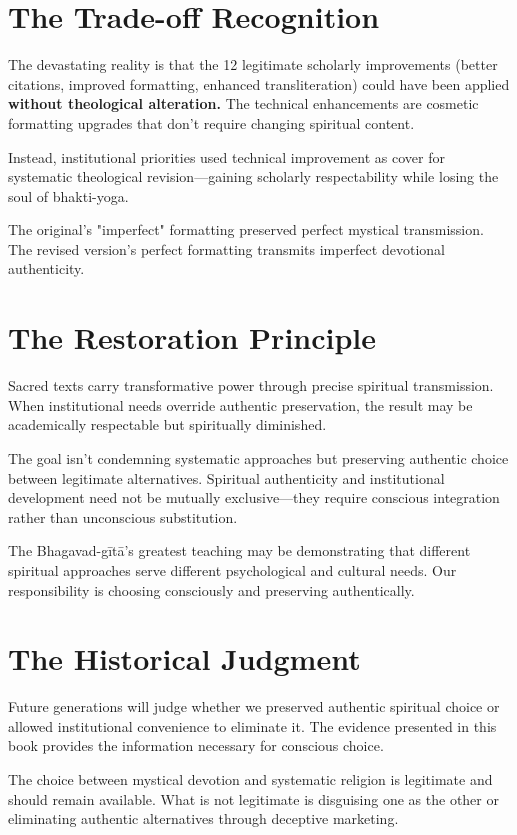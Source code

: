 \documentclass[11pt,twoside]{book}
\begin{document}
\section*{The Trade-off Recognition}
\label{sec:org1c2ef7d}

The devastating reality is that the 12 legitimate scholarly improvements (better citations, improved formatting, enhanced transliteration) could have been applied \textbf{\textbf{without theological alteration.}} The technical enhancements are cosmetic formatting upgrades that don't require changing spiritual content.

Instead, institutional priorities used technical improvement as cover for systematic theological revision—gaining scholarly respectability while losing the soul of bhakti-yoga.

The original's "imperfect" formatting preserved perfect mystical transmission. The revised version's perfect formatting transmits imperfect devotional authenticity.
\section*{The Restoration Principle}
\label{sec:org077134f}

Sacred texts carry transformative power through precise spiritual transmission. When institutional needs override authentic preservation, the result may be academically respectable but spiritually diminished.

The goal isn't condemning systematic approaches but preserving authentic choice between legitimate alternatives. Spiritual authenticity and institutional development need not be mutually exclusive—they require conscious integration rather than unconscious substitution.

The Bhagavad-gītā's greatest teaching may be demonstrating that different spiritual approaches serve different psychological and cultural needs. Our responsibility is choosing consciously and preserving authentically.
\section*{The Historical Judgment}
\label{sec:org4a0230e}

Future generations will judge whether we preserved authentic spiritual choice or allowed institutional convenience to eliminate it. The evidence presented in this book provides the information necessary for conscious choice.

The choice between mystical devotion and systematic religion is legitimate and should remain available. What is not legitimate is disguising one as the other or eliminating authentic alternatives through deceptive marketing.
\end{document}
